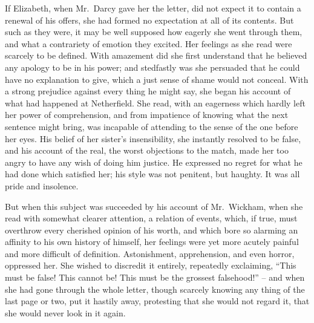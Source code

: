 If Elizabeth, when Mr.\ Darcy gave her the letter, did
not expect it to contain a renewal of his offers, she had
formed no expectation at all of its contents. But such
as they were, it may be well supposed how eagerly she
went through them, and what a contrariety of emotion
they excited. Her feelings as she read were scarcely to
be defined. With amazement did she first understand
that he believed any apology to be in his power; and
stedfastly was she persuaded that he could have no
explanation to give, which a just sense of shame would
not conceal. With a strong prejudice against every thing
he might say, she began his account of what had happened
at Netherfield. She read, with an eagerness which hardly
left her power of comprehension, and from impatience of
knowing what the next sentence might bring, was incapable
of attending to the sense of the one before her eyes. His
belief of her sister’s insensibility, she instantly resolved
to be false, and his account of the real, the worst objections
to the match, made her too angry to have any wish of
doing him justice. He expressed no regret for what he
had done which satisfied her; his style was not penitent,
but haughty. It was all pride and insolence.

But when this subject was succeeded by his account
of Mr.\ Wickham, when she read with somewhat clearer
attention, a relation of events, which, if true, must overthrow
every cherished opinion of his worth, and which
bore so alarming an affinity to his own history of himself,
her feelings were yet more acutely painful and more
difficult of definition. Astonishment, apprehension, and
even horror, oppressed her. She wished to discredit it
entirely, repeatedly exclaiming, “This must be false!
This cannot be! This must be the grossest falsehood!” -- and
when she had gone through the whole letter, though
scarcely knowing any thing of the last page or two, put
it hastily away, protesting that she would not regard it,
that she would never look in it again.

